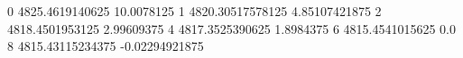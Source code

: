 0 4825.4619140625 10.0078125
1 4820.30517578125 4.85107421875
2 4818.4501953125 2.99609375
4 4817.3525390625 1.8984375
6 4815.4541015625 0.0
8 4815.43115234375 -0.02294921875
